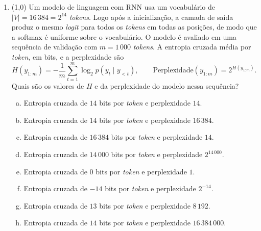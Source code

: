 \documentclass[11pt,a4paper]{article}
\begin{document}
\begin{enumerate}[1)]
\item (1{,}0) Um modelo de linguagem com RNN usa um vocabulário de $|V| = 16\,384 = 2^{14}$ \textit{tokens}. Logo após a inicialização, a camada de saída produz o mesmo \textit{logit} para todos os \textit{tokens} em todas as posições, de modo que a softmax é uniforme sobre o vocabulário. O modelo é avaliado em uma sequência de validação com $m = 1\,000$ \textit{tokens}. A entropia cruzada média por \textit{token}, em bits, e a perplexidade são
\[
H(y_{1:m}) = -\frac{1}{m}\sum_{t=1}^{m} \log_2 p(y_t \mid y_{<t}), \qquad \text{Perplexidade}(y_{1:m}) = 2^{H(y_{1:m})}.
\]
Quais são os valores de $H$ e da perplexidade do modelo nessa sequência?
\begin{enumerate}[a)]
    \item Entropia cruzada de $14$ bits por \textit{token} e perplexidade $14$.
    \item Entropia cruzada de $14$ bits por \textit{token} e perplexidade $16\,384$.
    \item Entropia cruzada de $16\,384$ bits por \textit{token} e perplexidade $14$.
    \item Entropia cruzada de $14\,000$ bits por \textit{token} e perplexidade $2^{14\,000}$.
    \item Entropia cruzada de $0$ bits por \textit{token} e perplexidade $1$.
    \item Entropia cruzada de $-14$ bits por \textit{token} e perplexidade $2^{-14}$.
    \item Entropia cruzada de $13$ bits por \textit{token} e perplexidade $8\,192$.
    \item Entropia cruzada de $14$ bits por \textit{token} e perplexidade $16\,384\,000$.
\end{enumerate}


\end{enumerate}
\end{document}
